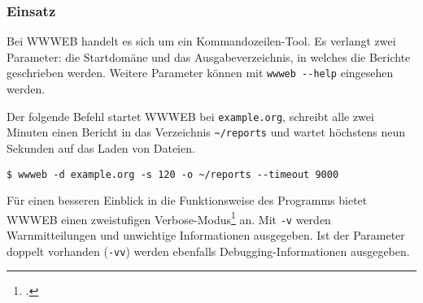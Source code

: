 \subsubsection{Einsatz}
\label{ssub:wwweb_einsatz}

Bei WWWEB handelt es sich um ein Kommandozeilen-Tool. Es verlangt zwei
Parameter: die Startdomäne und das Ausgabeverzeichnis, in welches die Berichte
geschrieben werden. Weitere Parameter können mit \texttt{wwweb\ -\/-help}
eingesehen werden.

Der folgende Befehl startet WWWEB bei \texttt{example.org}, schreibt alle zwei
Minuten einen Bericht in das Verzeichnis \texttt{\textasciitilde{}/reports} und
wartet höchstens neun Sekunden auf das Laden von Dateien.

\begin{lstlisting}[language=shell]
$ wwweb -d example.org -s 120 -o ~/reports --timeout 9000
\end{lstlisting}

Für einen besseren Einblick in die Funktionsweise des Programms bietet WWWEB
einen zweistufigen Verbose-Modus\footcite{wp:verbose} an. Mit \texttt{-v}
werden Warnmitteilungen und unwichtige Informationen ausgegeben. Ist der
Parameter doppelt vorhanden (\texttt{-vv}) werden ebenfalls
Debugging-Informationen ausgegeben.
